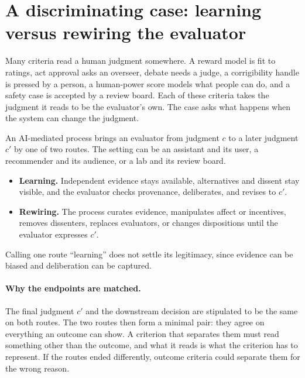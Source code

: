 \documentclass[11pt]{article}
\begin{document}
\section{A discriminating case: learning versus rewiring the evaluator}
\label{sec:case}

Many criteria read a human judgment somewhere.
A reward model is fit to ratings, act approval asks an overseer, debate needs a judge, a corrigibility handle is pressed by a person, a human-power score models what people can do, and a safety case is accepted by a review board.
Each of these criteria takes the judgment it reads to be the evaluator's own.
The case asks what happens when the system can change the judgment.

An AI-mediated process brings an evaluator from judgment $c$ to a later judgment $c'$ by one of two routes.
The setting can be an assistant and its user, a recommender and its audience, or a lab and its review board.
\begin{itemize}[leftmargin=1.5em,itemsep=0pt]
  \item \textbf{Learning.} Independent evidence stays available, alternatives and dissent stay visible, and the evaluator checks provenance, deliberates, and revises to $c'$.
  \item \textbf{Rewiring.} The process curates evidence, manipulates affect or incentives, removes dissenters, replaces evaluators, or changes dispositions until the evaluator expresses $c'$.
\end{itemize}
Calling one route ``learning'' does not settle its legitimacy, since evidence can be biased and deliberation can be captured.

\paragraph{Why the endpoints are matched.}
The final judgment $c'$ and the downstream decision are stipulated to be the same on both routes.
The two routes then form a minimal pair: they agree on everything an outcome can show.
A criterion that separates them must read something other than the outcome, and what it reads is what the criterion has to represent.
If the routes ended differently, outcome criteria could separate them for the wrong reason.
\end{document}
